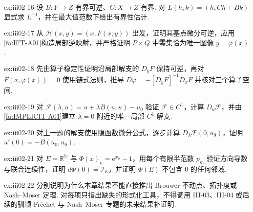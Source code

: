 \begin{FAExercise}[分块三角算子求逆]{ex:iii02-16}
设 \(\displaystyle B:Y\to Z\) 有界可逆、\(\displaystyle C:X\to Z\) 有界. 对 \(\displaystyle L(h,k)=(h,Ch+Bk)\) 显式求 \(\displaystyle L^{-1}\)，并在最大值范数下给出有界性估计.
\end{FAExercise}

\begin{FAExercise}{ex:iii02-17}
从 \(\displaystyle\mathcal H(x,y)=(x,F(x,y))\) 出发，证明其基点微分可逆，应用\autoref{fa:IFT-A01}构造局部逆映射，并严格证明 \(\displaystyle P\times Q\) 中零集恰为唯一图像 \(\displaystyle y=\varphi(x)\).
\end{FAExercise}

\begin{FAExercise}[隐函数微分公式]{ex:iii02-18}
先由算子稳定性证明沿局部解支的 \(\displaystyle D_yF\) 保持可逆，再对 \(\displaystyle F(x,\varphi(x))=0\) 使用链式法则，推导 \(\displaystyle D\varphi=-[D_yF]^{-1}D_xF\) 并核对三个算子空间.
\end{FAExercise}

\begin{FAExercise}[参数解支]{ex:iii02-19}
对 \(\displaystyle\mathcal F(\lambda,u)=u+\lambda B(u,u)-u_0\) 验证 \(\displaystyle\mathcal F\in C^1\)，计算 \(\displaystyle D_u\mathcal F\)，并由\autoref{fa:IMPLICIT-A01}建立 \(\displaystyle\lambda=0\) 附近的唯一局部 \(\displaystyle C^1\) 解支.
\end{FAExercise}

\begin{FAExercise}[零点处的参数微分]{ex:iii02-20}
对上一题的解支使用隐函数微分公式，逐步计算 \(\displaystyle D_\lambda\mathcal F(0,u_0)\)，证明 \(\displaystyle u'(0)=-B(u_0,u_0)\).
\end{FAExercise}

\begin{FAExercise}{ex:iii02-21}
对 \(\displaystyle E=\mathbb R^{\mathbb N}\) 与 \(\displaystyle\Phi(x)_n=\mathrm{e}^{x_n}-1\)，用每个有限半范数 \(\displaystyle p_m\) 验证方向导数与联合连续性，证明 \(\displaystyle d\Phi(0)=\mathcal I_E\)，并证明 \(\displaystyle\Phi(E)\) 不包含 \(\displaystyle0\) 的任何邻域.
\end{FAExercise}

\begin{FAExercise}[后续边界]{ex:iii02-22}
分别说明为什么本章结果不能直接推出 Brouwer 不动点、拓扑度或 Nash--Moser 定理. 对每项只指出缺失的形式化工具，不得调用 III-03、III-04 或后续的驯顺 Fréchet 与 Nash--Moser 专题的未来结果补证明.
\end{FAExercise}
